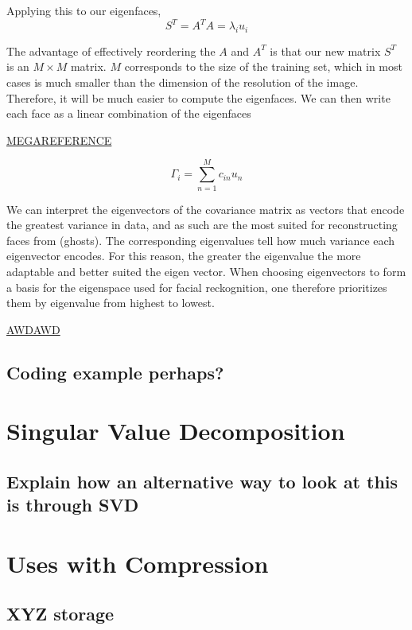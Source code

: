 \documentclass[12pt]{report}
\begin{document}
            Applying this to our eigenfaces,
                \[
                    S^T = A^T A = \lambda_i u_i
                \]
    
            The advantage of effectively reordering the $A$ and $A^T$ is that our new matrix $S^T$ is an $M \times M$ matrix. $M$ corresponds to the size of the training set, which in most cases is much smaller than the dimension of the resolution of the image. Therefore, it will be much easier to compute the eigenfaces. We can then write each face as a linear combination of the eigenfaces
            
            \href{https://datascienceplus.com/understanding-the-covariance-matrix/}{MEGAREFERENCE}
            
            \[
                \Gamma_i = \sum_{n=1}^M c_{in} u_{n}
            \]
    
            We can interpret the eigenvectors of the covariance matrix as vectors that encode the greatest variance in data, and as such are the most suited for reconstructing faces from (ghosts). The corresponding eigenvalues tell how much variance each eigenvector encodes. For this reason, the greater the eigenvalue the more adaptable and better suited the eigen vector. When choosing eigenvectors to form a basis for the eigenspace used for facial reckognition, one therefore prioritizes them by eigenvalue from highest to lowest.
            
            \href{http://math.clarku.edu/\textasciitilde djoyce/ma217/covar.pdf}{AWDAWD}
    
    \section{Coding example perhaps?}
    \blindtext
    
    \chapter{Singular Value Decomposition}
    \section{Explain how an alternative way to look at this is through SVD}
    
    \chapter{Uses with Compression}
    \section{XYZ storage}
    \blindtext[1]
\end{document}
